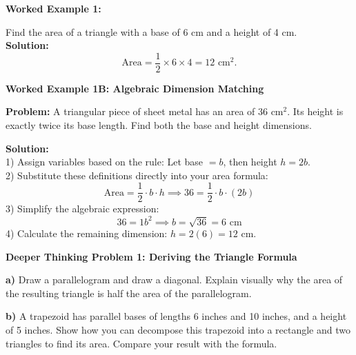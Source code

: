 \documentclass[12pt, letterpaper, fleqn]{article}
\begin{document}
\vspace{1cm}

\begin{tcolorbox}[colback=white, colframe=black!25, boxrule=0.6pt, arc=4mm, left=6mm, right=6mm, top=5mm, bottom=5mm]
\textbf{Worked Example 1:}

\medskip
\noindent
Find the area of a triangle with a base of 6 cm and a height of 4 cm.\\
\textbf{Solution:} \\
$$\text{Area} = \frac{1}{2} \times 6 \times 4 = 12\text{ cm}^2.$$
\end{tcolorbox}

\vspace{4mm}

\begin{tcolorbox}[colback=white, colframe=black!25, boxrule=0.6pt, arc=4mm, left=6mm, right=6mm, top=5mm, bottom=5mm]
\textbf{Worked Example 1B: Algebraic Dimension Matching}

\medskip
\noindent
\textbf{Problem:} A triangular piece of sheet metal has an area of 36 cm$^2$. Its height is exactly twice its base length. Find both the base and height dimensions.

\medskip
\noindent
\textbf{Solution:} \\
1) Assign variables based on the rule: Let base $= b$, then height $h = 2b$. \\
2) Substitute these definitions directly into your area formula:
$$\text{Area} = \frac{1}{2} \cdot b \cdot h \implies 36 = \frac{1}{2} \cdot b \cdot (2b)$$
3) Simplify the algebraic expression:
$$36 = 1b^2 \implies b = \sqrt{36} = 6\text{ cm}$$
4) Calculate the remaining dimension: $h = 2(6) = 12\text{ cm}$.
\end{tcolorbox}
\vspace{4mm}

\begin{tcolorbox}[colback=white, colframe=black, boxrule=1pt, arc=4mm, left=6mm, right=6mm, top=5mm, bottom=5mm]
\textbf{Deeper Thinking Problem 1: Deriving the Triangle Formula}

\medskip

\noindent
\textbf{a)} Draw a parallelogram and draw a diagonal. Explain visually why the area of the resulting triangle is half the area of the parallelogram.

\vspace{3.5cm}

\noindent
\textbf{b)} A trapezoid has parallel bases of lengths 6 inches and 10 inches, and a height of 5 inches. Show how you can decompose this trapezoid into a rectangle and two triangles to find its area. Compare your result with the formula.

\vspace{3.5cm}
\end{tcolorbox}
\newpage
\end{document}
